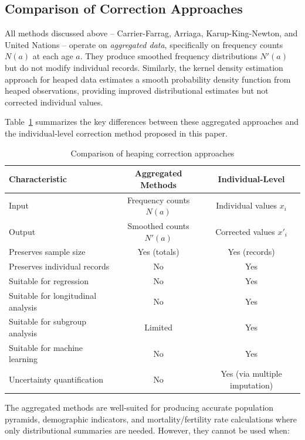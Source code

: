 \documentclass[pdflatex,sn-mathphys-num]{sn-jnl}%
\theoremstyle{thmstyleone}%
\theoremstyle{thmstyletwo}%
\theoremstyle{thmstylethree}%
\begin{document}
\subsection{Comparison of Correction Approaches}

All methods discussed above -- Carrier-Farrag, Arriaga, Karup-King-Newton, and 
United Nations -- operate on \emph{aggregated data}, specifically on frequency counts $N(a)$ at each age $a$. They produce smoothed frequency distributions $N'(a)$ but do not modify individual records. Similarly, the kernel density estimation approach for heaped data \citep{kernelheaping} estimates a smooth probability density function from heaped observations, providing improved distributional estimates but not corrected individual values.

Table~\ref{tab:comparison} summarizes the key differences between these aggregated approaches and the individual-level correction method proposed in this paper.

\begin{table}[htbp]
\caption{Comparison of heaping correction approaches}\label{tab:comparison}
\centering
\begin{tabular}{lcc}
\toprule
\textbf{Characteristic} & \textbf{Aggregated Methods} & \textbf{Individual-Level} \\
\midrule
Input & Frequency counts $N(a)$ & Individual values $x_i$ \\
Output & Smoothed counts $N'(a)$ & Corrected values $x'_i$ \\
Preserves sample size & Yes (totals) & Yes (records) \\
Preserves individual records & No & Yes \\
Suitable for regression & No & Yes \\
Suitable for longitudinal analysis & No & Yes \\
Suitable for subgroup analysis & Limited & Yes \\
Suitable for machine learning & No & Yes \\
Uncertainty quantification & No & Yes (via multiple imputation) \\
\bottomrule
\end{tabular}
\end{table}

The aggregated methods are well-suited for producing accurate population pyramids, demographic indicators, and mortality/fertility rate calculations where only distributional summaries are needed. However, they cannot be used when:
\end{document}
